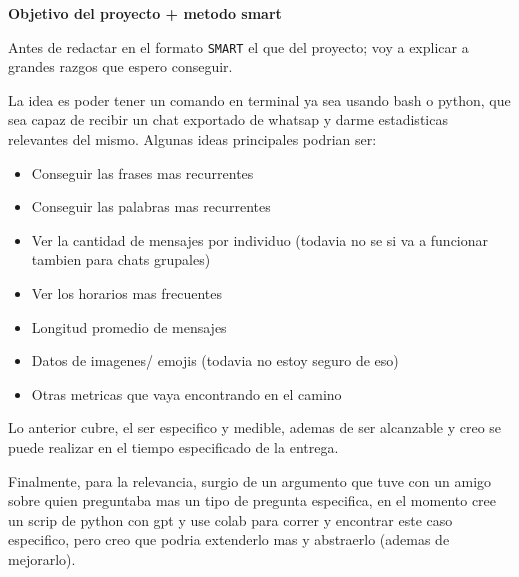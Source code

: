 \textbf{Objetivo del proyecto + metodo smart}\vspace{.5cm}


Antes de redactar en el formato \texttt{SMART} el que del proyecto; voy a explicar a grandes razgos que espero conseguir. \vspace{.3cm}

La idea es poder tener un comando en terminal ya sea usando bash o python, que sea capaz de recibir un chat exportado de whatsap y darme estadisticas relevantes del mismo. Algunas ideas principales podrian ser: 

\begin{itemize}
    \item Conseguir las frases mas recurrentes
    \item Conseguir las palabras mas recurrentes
    \item Ver la cantidad de mensajes por individuo (todavia no se si va a funcionar tambien para chats grupales)
    \item Ver los horarios mas frecuentes 
    \item Longitud promedio de mensajes 
    \item Datos de imagenes/ emojis (todavia no estoy seguro de eso)
    \item Otras metricas que vaya encontrando en el camino
\end{itemize}

Lo anterior cubre, el ser especifico y medible, ademas de ser alcanzable y creo se puede realizar en el tiempo especificado de la entrega.   \vspace{.3cm}

Finalmente, para la relevancia, surgio de un argumento que tuve con un amigo sobre quien preguntaba mas un tipo de pregunta especifica, en el momento cree un scrip de python con gpt y use colab para correr y encontrar este caso especifico, pero creo que podria extenderlo mas y abstraerlo (ademas de mejorarlo). \vspace{.3cm}